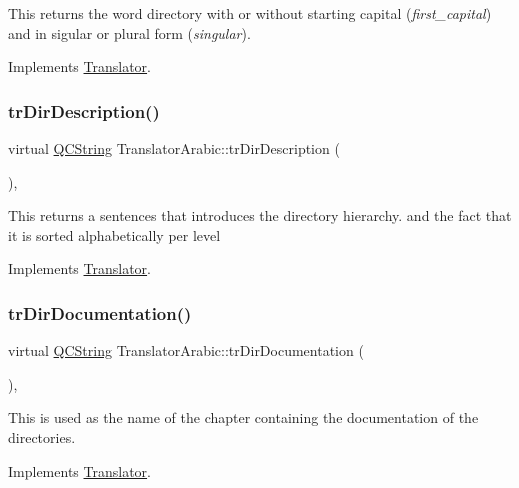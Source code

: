 This returns the word directory with or without starting capital ({\itshape first\+\_\+capital}) and in sigular or plural form ({\itshape singular}). 

Implements \mbox{\hyperlink{class_translator}{Translator}}.

\mbox{\label{class_translator_arabic_a6e5949ba70cda34290d8fb987ff1e4c9}} 
\subsubsection{\texorpdfstring{trDirDescription()}{trDirDescription()}}
{\footnotesize\ttfamily virtual \mbox{\hyperlink{class_q_c_string}{Q\+C\+String}} Translator\+Arabic\+::tr\+Dir\+Description (\begin{DoxyParamCaption}{ }\end{DoxyParamCaption})\hspace{0.3cm}{\ttfamily [inline]}, {\ttfamily [virtual]}}

This returns a sentences that introduces the directory hierarchy. and the fact that it is sorted alphabetically per level 

Implements \mbox{\hyperlink{class_translator}{Translator}}.

\mbox{\label{class_translator_arabic_a42bc84de896868f2309af1cb41abfbaf}} 
\subsubsection{\texorpdfstring{trDirDocumentation()}{trDirDocumentation()}}
{\footnotesize\ttfamily virtual \mbox{\hyperlink{class_q_c_string}{Q\+C\+String}} Translator\+Arabic\+::tr\+Dir\+Documentation (\begin{DoxyParamCaption}{ }\end{DoxyParamCaption})\hspace{0.3cm}{\ttfamily [inline]}, {\ttfamily [virtual]}}

This is used as the name of the chapter containing the documentation of the directories. 

Implements \mbox{\hyperlink{class_translator}{Translator}}.

